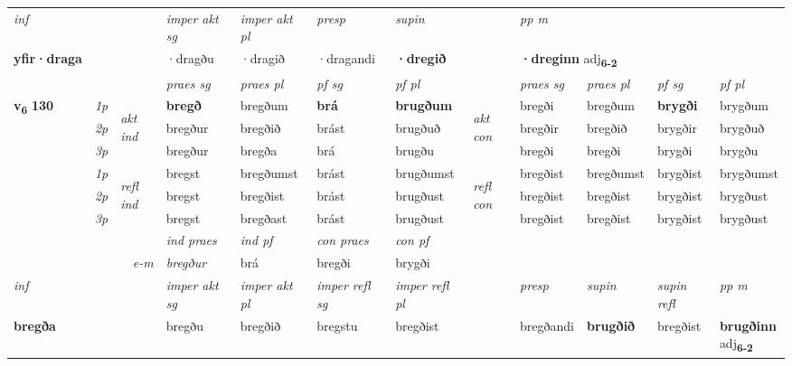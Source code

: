 \begin{longtable}[l]{X>{\footnotesize\itshape}llXXXXlXXXX}
   {\textit{inf}} & &  & \textit{imper akt sg} & \textit{imper akt pl}   & \textit{presp} & \textit{supin}  && \textit{pp m} \\*
  {\textbf{yfir\allowbreak ·draga}} & && ·dragðu  & ·dragið   & ·dragandi &  \textbf{·dregið}  && \multicolumn{2}{l}{\textbf{·dreginn} adj\textbf{\textsubscript{6-2}}} \\*

\midrule

 & &   & \textit{praes sg}  & \textit{praes pl}    & \textit{ pf sg} & \textit{pf pl} & & \textit{praes sg}  & \textit{praes pl}    & \textit{pf sg} & \textit{pf pl }  \\ \cmidrule{4-7} \cmidrule{9-12}
 \multirow{2}{*}{{{\textbf{v{\textsubscript{6}}} \Large{\textbf{130}}}}}  & 1p & \multirow{3}{*}{\begin{turn}{90}\textit{akt ind}\end{turn}} & \textbf{bregð} & bregðum & \textbf{brá} & \textbf{brugðum} & \multirow{3}{*}{\begin{turn}{90}\textit{akt con}\end{turn}} &bregði & bregðum & \textbf{brygði} & brygðum\\*
 & 2p &  &  bregður  & bregðið & brást & brugðuð & & bregðir & bregðið & brygðir & brygðuð \\*
 & 3p &  & bregður & bregða & brá & brugðu & & bregði & bregði& brygði & brygðu \\*
\cmidrule{4-7} \cmidrule{9-12}
 & 1p & \multirow{3}{*}{\begin{turn}{90}\textit{refl ind}\end{turn}}  & bregst & bregðumst & brást & brugðumst & \multirow{3}{*}{\begin{turn}{90}\textit{refl con}\end{turn}}  &bregðist & bregðumst & brygðist & brygðumst \\*
 & 2p &  & bregst & bregðist & brást & brugðust & &bregðist & bregðist & brygðist & brygðust \\*
 & 3p  & & bregst & bregðast & brást & brugðust & & bregðist & bregðist& brygðist & brygðust \\*
\cmidrule{4-7} \cmidrule{9-12}

   && &  \textit{ind praes} & \textit{ind pf} & \textit{con praes} & \textit{con pf} \\*
\multicolumn{3}{r}{\textit{e-m}} & bregður & brá & bregði & brygði \\*

\cmidrule{4-7}
   {\textit{inf}} & &  & \textit{imper akt sg} & \textit{imper akt pl} & \textit{imper refl sg} & \textit{imper refl pl} && \textit{presp} & \textit{supin} & \textit{supin refl} & \textit{pp m} \\*
  {\textbf{bregða}} & && bregðu  & bregðið & bregstu & bregðist && bregðandi &  \textbf{brugðið} & bregðist & \specialcell{\textbf{brugðinn} \\ adj\textbf{\textsubscript{6-2}}} \\*


\end{longtable}
